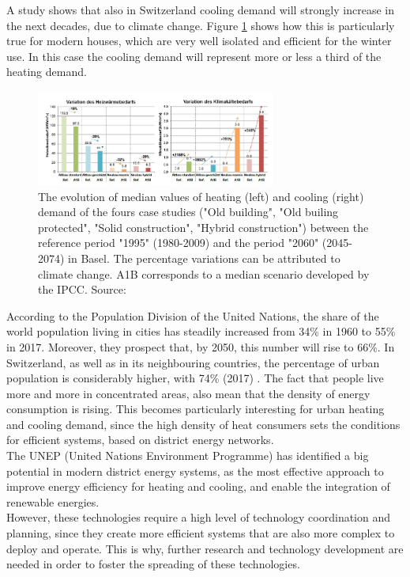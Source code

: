 \documentclass{article}
\begin{document}
A study shows that also in Switzerland cooling demand will strongly increase in the next decades, due to climate change. Figure \ref{fig:climat_CH} shows how this is particularly true for modern houses, which are very well isolated and efficient for the winter use. In this case the cooling demand will represent more or less a third of the heating demand\cite{hsluClimaBauPlanenAngesichts2017}.\\

\begin{figure}[h!]
\centering
\includegraphics[width=0.7\textwidth]{climat_CH.JPG}
\caption{The evolution of median values of heating (left) and cooling (right) demand of the fours case studies ("Old building", "Old builing protected", "Solid construction", "Hybrid construction") between the reference period "1995" (1980-2009) and the period "2060" (2045-2074) in Basel. The percentage variations can be attributed to climate change. A1B corresponds to a median scenario developed by the IPCC. Source: \cite{hsluClimaBauPlanenAngesichts2017}}
\label{fig:climat_CH}
\end{figure}


According to the Population Division of the United Nations, the share of the world population living in cities has steadily increased from 34\% in 1960 to 55\% in 2017. Moreover, they prospect that, by 2050, this number will rise to 66\%. In Switzerland, as well as in its neighbouring countries, the percentage of urban population is considerably higher, with 74\% (2017) \cite{unitednationspopulationdivisionWorldUrbanizationProspects}.
The fact that people live more and more in concentrated areas, also mean that the density of energy consumption is rising. This becomes particularly interesting for urban heating and cooling demand, since the high density of heat consumers sets the conditions for efficient  systems, based on district energy networks.\\
The UNEP (United Nations Environment Programme) has identified a big potential in modern district energy systems, as the most effective approach to improve energy efficiency for heating and cooling, and enable the integration of renewable energies. \\
However, these technologies require a high level of technology coordination and planning, since they create more efficient systems that are also more complex to deploy and operate. This is why, further research and technology development are needed in order to foster the spreading of these technologies.
\end{document}
